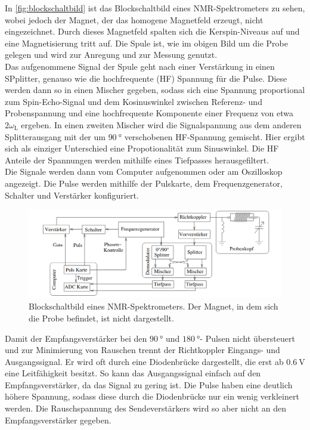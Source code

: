         \noindent In \autoref{fig:blockschaltbild} ist das Blockschaltbild eines NMR-Spektrometers zu sehen, wobei jedoch der Magnet, der das homogene Magnetfeld erzeugt, nicht eingezeichnet. Durch dieses Magnetfeld 
        spalten sich die Kerspin-Niveaus auf und eine Magnetisierung tritt auf. Die Spule ist, wie im obigen Bild um die Probe gelegen und wird zur Anregung und zur Messung genutzt. \\
        Das aufgenommene Signal der Spule geht nach einer Verstärkung in einen SPplitter, genauso wie die hochfrequente (HF) Spannung für die Pulse. Diese werden dann so in einen Mischer gegeben, sodass sich 
        eine Spannung proportional zum Spin-Echo-Signal und dem Kosinuswinkel zwischen Referenz- und Probenspannung und eine hochfrequente Komponente einer Frequenz von etwa $2\omega_\text{L}$ ergeben. 
        In einen zweiten Mischer wird die Signalspannung aus dem anderen Splitterausgang mit der um $\SI{90}{\degree}$ verschobenen HF-Spannung gemischt. Hier ergibt sich als einziger Unterschied eine 
        Propotionalität zum Sinuswinkel. Die HF Anteile der Spannungen werden mithilfe eines Tiefpasses herausgefiltert.\\ Die Signale werden dann vom Computer aufgenommen oder am Oszilloskop angezeigt. 
        Die Pulse werden mithilfe der Pulskarte, dem Frequenzgenerator, Schalter und Verstärker konfiguriert.

        \begin{figure}[H]
            \centering
            \includegraphics{images/blockschaltbild_nmr.png}
            \caption{Blockschaltbild eines NMR-Spektrometers. Der Magnet, in dem sich die Probe befindet, ist nicht dargestellt. \cite{grundlagen}}
            \label{fig:blockschaltbild}
        \end{figure}

        \noindent Damit der Empfangsverstärker bei den $\SI{90}{\degree}$ und $\SI{180}{\degree}$- Pulsen nicht übersteuert und zur Minimierung von Rauschen trennt der Richtkoppler Eingangs- und Ausgangssignal. 
        Er wird oft durch eine Diodenbrücke dargestellt, die erst ab $\SI{0.6}{\volt}$ eine Leitfähigkeit besitzt. So kann das Ausgangssignal einfach auf den Empfangsverstärker, da das Signal zu gering ist. 
        Die Pulse haben eine deutlich höhere Spannung, sodass diese durch die Diodenbrücke nur ein wenig verkleinert werden. Die Rauschspannung des Sendeverstärkers wird so aber nicht an den Empfangsverstärker 
        gegeben. 

